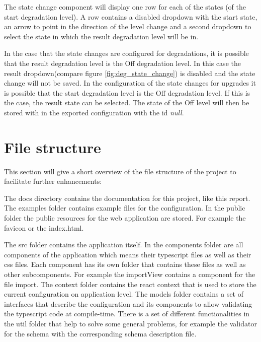 \noindent The state change component will display one row for each of the states (of the start degradation level). A row contains a disabled dropdown with the start state, an arrow to point in the direction of the level change and a second dropdown to select the state in which the result degradation level will be in.

In the case that the state changes are configured for degradations, it is possible that the result degradation level is the Off degradation level. In this case the result dropdown(compare figure \ref{fig:deg_state_change}) is disabled and the state change will not be saved. In the configuration of the state changes for upgrades it is possible that the start degradation level is the Off degradation level. If this is the case, the result state can be selected. The state of the Off level will then be stored with in the exported configuration with the id \textit{null}. 

\newpage

\section{File structure}
This section will give a short overview of the file structure of the project to facilitate further enhancements:

\hfill

The docs directory contains the documentation for this project, like this report. The examples folder contains example files for the configuration. In the public folder the public resources for the web application are stored. For example the favicon or the index.html.

The src folder contains the application itself. In the components folder are all components of the application which means their typescript files as well as their css files. Each component has its own folder that contains these files as well as other subcomponents. For example the importView contains a component for the file import. The context folder contains the react context that is used to store the current configuration on application level. The models folder contains a set of interfaces that describe the configuration and its components to allow validating the typescript code at compile-time. There is a set of different functionalities in the util folder that help to solve some general problems, for example the validator for the schema with the corresponding schema description file.
